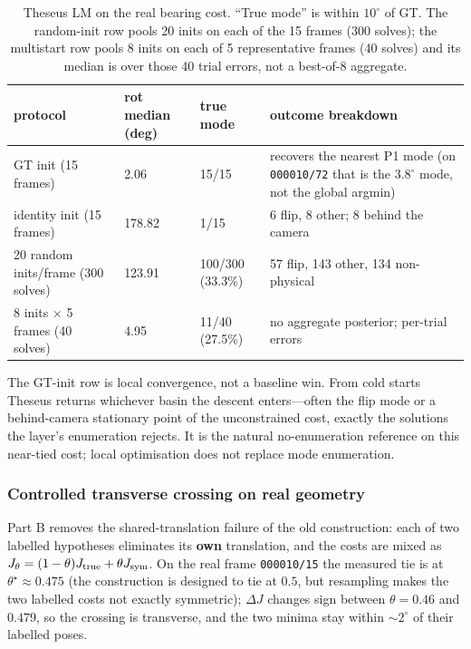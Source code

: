 \begin{table}[t]
\centering
\caption{Theseus LM on the real bearing cost. ``True mode'' is within $10^\circ$ of GT. The random-init row pools 20 inits on each of the 15 frames (300 solves); the multistart row pools 8 inits on each of 5 representative frames (40 solves) and its median is over those 40 trial errors, not a best-of-8 aggregate.}
\label{tab:theseus}
\footnotesize
\setlength{\tabcolsep}{4pt}
\begin{tabular}{@{}l l l p{7.4cm}@{}}
\toprule
protocol & rot median (deg) & true mode & outcome breakdown\\
\midrule
GT init (15 frames) & 2.06 & 15/15 & recovers the nearest P1 mode (on \texttt{000010/72} that is the $3.8^\circ$ mode, not the global argmin)\\
identity init (15 frames) & 178.82 & 1/15 & 6 flip, 8 other; 8 behind the camera\\
20 random inits/frame (300 solves) & 123.91 & 100/300 (33.3\%) & 57 flip, 143 other, 134 non-physical\\
8 inits $\times$ 5 frames (40 solves) & 4.95 & 11/40 (27.5\%) & no aggregate posterior; per-trial errors\\
\bottomrule
\end{tabular}
\end{table}

The GT-init row is local convergence, not a baseline win. From cold starts Theseus returns whichever basin the descent enters---often the flip mode or a behind-camera stationary point of the unconstrained cost, exactly the solutions the layer's enumeration rejects. It is the natural no-enumeration reference on this near-tied cost; local optimisation does not replace mode enumeration.

\subsubsection{Controlled transverse crossing on real geometry}\label{sec:partb}

Part B removes the shared-translation failure of the old construction: each of two labelled hypotheses eliminates its \textbf{own} translation, and the costs are mixed as $J_\theta=(1-\theta)J_{\rm true}+\theta J_{\rm sym}$. On the real frame \texttt{000010/15} the measured tie is at $\theta^\star\approx0.475$ (the construction is designed to tie at $0.5$, but resampling makes the two labelled costs not exactly symmetric); $\Delta J$ changes sign between $\theta=0.46$ and $0.479$, so the crossing is transverse, and the two minima stay within $\sim2^\circ$ of their labelled poses.

